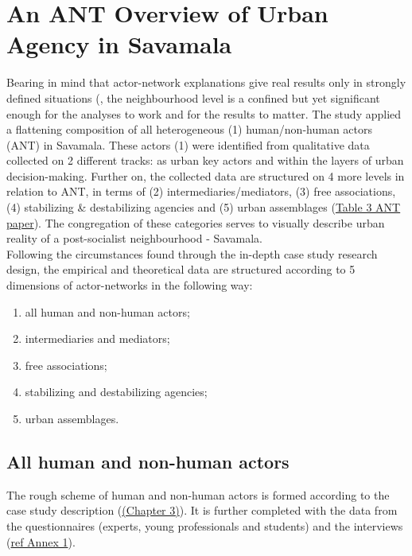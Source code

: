 \documentclass[11pt]{report}
\begin{document}
\section{An ANT Overview of Urban Agency in Savamala}

Bearing in mind that actor-network explanations give real results only in strongly defined situations (\href{ref}{\citealt{farias_urban_2011}}, the neighbourhood level is a confined but yet significant enough for the analyses to work and for the results to matter.
The study applied a flattening composition of all heterogeneous (1) human/non-human actors (ANT) in Savamala.
These actors (1) were identified from qualitative data collected on 2 different tracks: as urban key actors and within the layers of urban decision-making.
Further on, the collected data are structured on 4 more levels in relation to ANT, in terms of (2) intermediaries/mediators, (3) free associations, (4) stabilizing \& destabilizing agencies and (5) urban assemblages (\href{ref}{Table 3 ANT paper}).
The congregation of these categories serves to visually describe urban reality of a post-socialist neighbourhood - Savamala.
\\

Following the circumstances found through the in-depth case study research design, the empirical and theoretical data are structured according to 5 dimensions of actor-networks in the following way:

\begin{enumerate}
\item all human and non-human actors;
\item intermediaries and mediators;
\item free associations;
\item stabilizing and destabilizing agencies;
\item urban assemblages.
\end{enumerate}

\subsection{All human and non-human actors}

The rough scheme of human and non-human actors is formed according to the case study description
(\href{ref}{(Chapter 3)}). It is further completed with the data from the questionnaires (experts, young professionals and students) and the interviews
(\href{ref}{ref Annex 1}).
\\
\end{document}
